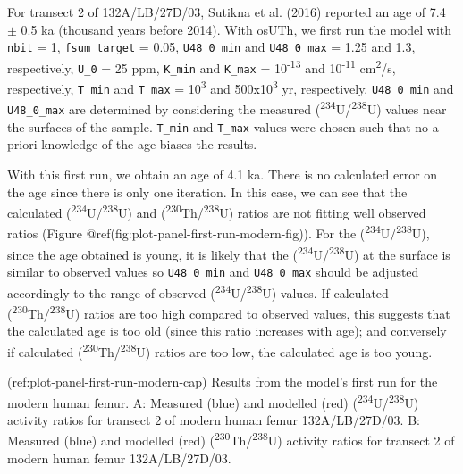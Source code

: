 \documentclass[]{elsarticle} %
\begin{document}
For transect 2 of 132A/LB/27D/03, Sutikna et al. (2016) reported an age of 7.4 \(\pm\) 0.5 ka (thousand years before 2014). With osUTh, we first run the model with \texttt{nbit} = 1, \texttt{fsum\_target} = 0.05, \texttt{U48\_0\_min} and \texttt{U48\_0\_max} = 1.25 and 1.3, respectively, \texttt{U\_0} = 25 ppm, \texttt{K\_min} and \texttt{K\_max} = 10\textsuperscript{-13} and 10\textsuperscript{-11} cm\textsuperscript{2}/s, respectively, \texttt{T\_min} and \texttt{T\_max} = 10\textsuperscript{3} and 500x10\textsuperscript{3} yr, respectively. \texttt{U48\_0\_min} and \texttt{U48\_0\_max} are determined by considering the measured (\textsuperscript{234}U/\textsuperscript{238}U) values near the surfaces of the sample. \texttt{T\_min} and \texttt{T\_max} values were chosen such that no a priori knowledge of the age biases the results.

With this first run, we obtain an age of 4.1 ka. There is no calculated error on the age since there is only one iteration. In this case, we can see that the calculated (\textsuperscript{234}U/\textsuperscript{238}U) and (\textsuperscript{230}Th/\textsuperscript{238}U) ratios are not fitting well observed ratios (Figure @ref(fig:plot-panel-first-run-modern-fig)). For the (\textsuperscript{234}U/\textsuperscript{238}U), since the age obtained is young, it is likely that the (\textsuperscript{234}U/\textsuperscript{238}U) at the surface is similar to observed values so \texttt{U48\_0\_min} and \texttt{U48\_0\_max} should be adjusted accordingly to the range of observed (\textsuperscript{234}U/\textsuperscript{238}U) values. If calculated (\textsuperscript{230}Th/\textsuperscript{238}U) ratios are too high compared to observed values, this suggests that the calculated age is too old (since this ratio increases with age); and conversely if calculated (\textsuperscript{230}Th/\textsuperscript{238}U) ratios are too low, the calculated age is too young.

(ref:plot-panel-first-run-modern-cap) Results from the model's first run for the modern human femur. A: Measured (blue) and modelled (red) (\textsuperscript{234}U/\textsuperscript{238}U) activity ratios for transect 2 of modern human femur 132A/LB/27D/03. B: Measured (blue) and modelled (red) (\textsuperscript{230}Th/\textsuperscript{238}U) activity ratios for transect 2 of modern human femur 132A/LB/27D/03.
\end{document}
